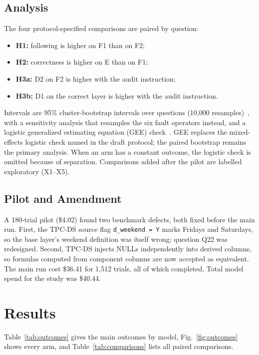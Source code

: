 \documentclass[conference]{IEEEtran}
\newcommand{\id}[1]{\texttt{#1}}
\begin{document}
\subsection{Analysis}

The four protocol-specified comparisons are paired by question:
\begin{itemize}
\item \textbf{H1:} following is higher on F1 than on F2;
\item \textbf{H2:} correctness is higher on E than on F1;
\item \textbf{H3a:} D2 on F2 is higher with the audit instruction;
\item \textbf{H3b:} D1 on the correct layer is higher with the audit instruction.
\end{itemize}
Intervals are 95\% cluster-bootstrap intervals over questions (10,000 resamples)~\cite{field2007bootstrap}, with a sensitivity analysis that resamples the six fault operators instead, and a logistic generalized estimating equation (GEE) check~\cite{liang1986gee}. GEE replaces the mixed-effects logistic check named in the draft protocol; the paired bootstrap remains the primary analysis. When an arm has a constant outcome, the logistic check is omitted because of separation. Comparisons added after the pilot are labelled exploratory (X1--X5).

\subsection{Pilot and Amendment}
\label{sec:pilot}

A 180-trial pilot (\$4.02) found two benchmark defects, both fixed before the main run. First, the TPC-DS source flag \id{d\_weekend = \textquotesingle Y\textquotesingle} marks Fridays and Saturdays, so the base layer's weekend definition was itself wrong; question Q22 was redesigned. Second, TPC-DS injects NULLs independently into derived columns, so formulas computed from component columns are now accepted as equivalent. The main run cost \$36.41 for 1,512 trials, all of which completed. Total model spend for the study was \$40.44.

\section{Results}

Table~\ref{tab:outcomes} gives the main outcomes by model, Fig.~\ref{fig:outcomes} shows every arm, and Table~\ref{tab:comparisons} lists all paired comparisons.
\end{document}
